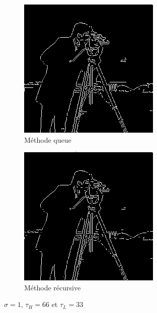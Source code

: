 \documentclass{article}
\begin{document}
\begin{figure}[H]
    \centering
    \begin{subfigure}[b]{0.45\linewidth}
        \centering
        \includegraphics[scale = 0.5]{TpIFT6150-2-canny_queue.png}
        \caption{Méthode queue}
    \end{subfigure}
    \begin{subfigure}[b]{0.45\linewidth}
        \centering
        \includegraphics[scale = 0.5]{TpIFT6150-2-canny_recursive.png}
        \caption{Méthode récursive}
    \end{subfigure}
    \caption{$\sigma = 1$, $\tau_H = 66$ et $\tau_L = 33$}
\end{figure}
\end{document}
